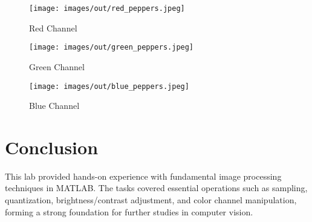 \documentclass[12pt,a4paper]{article}
\begin{document}
\begin{figure}[H]
    \centering
    \texttt{[image: images/out/red\_peppers.jpeg]}
    \caption{Red Channel}
\end{figure}
\begin{figure}[H]
    \centering
    \texttt{[image: images/out/green\_peppers.jpeg]}
    \caption{Green Channel}
\end{figure}
\begin{figure}[H]
    \centering
    \texttt{[image: images/out/blue\_peppers.jpeg]}
    \caption{Blue Channel}
\end{figure}

\section*{Conclusion}
This lab provided hands-on experience with fundamental image processing techniques in MATLAB. The tasks covered essential operations such as sampling, quantization, brightness/contrast adjustment, and color channel manipulation, forming a strong foundation for further studies in computer vision.
\end{document}
